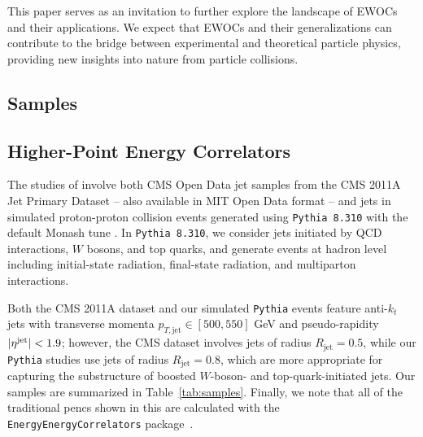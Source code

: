 
This paper serves as an invitation to further explore the landscape of EWOCs and their applications.
%
We expect that EWOCs and their generalizations can contribute to the bridge between experimental and theoretical particle physics, providing new insights into nature from particle collisions.




\begin{subappendices}

\section{Samples}
\label{app:energyweight-samples}

\subsection{Higher-Point Energy Correlators}
The studies of  involve both CMS Open Data jet samples from the CMS 2011A Jet Primary Dataset \cite{CERNOpenDataPortal, CMS:JetPrimary2011A} -- also available in MIT Open Data format \cite{Komiske:2019jim, komiske_patrick_2019_3340205} -- and jets in simulated proton-proton collision events generated using \texttt{Pythia 8.310} \cite{Bierlich:2022pfr} with the default Monash tune \cite{Skands:2014pea}.
%
In \texttt{Pythia 8.310}, we consider jets initiated by QCD interactions, \(W\) bosons, and top quarks, and generate events at hadron level including initial-state radiation, final-state radiation, and multiparton interactions.

Both the CMS 2011A dataset and our simulated \texttt{Pythia} events feature anti-$k_t$ jets \cite{Cacciari:2008gp} with transverse momenta $p_{T,\text{jet}} \in [500, 550]$ GeV and pseudo-rapidity $\vert \eta^{\rm jet} \vert < 1.9$;
%
however, the CMS dataset involves jets of radius \(R_\text{jet}=0.5\), while our \texttt{Pythia} studies use jets of radius \(R_\text{jet} = 0.8\), which are more appropriate for capturing the substructure of boosted $W$-boson- and top-quark-initiated jets.
%
Our samples are summarized in Table~\ref{tab:samples}.
%
Finally, we note that all of the traditional \glspl{penc} shown in this  are calculated with the \texttt{EnergyEnergyCorrelators} package~\cite{EEC_github}.


\end{subappendices}
